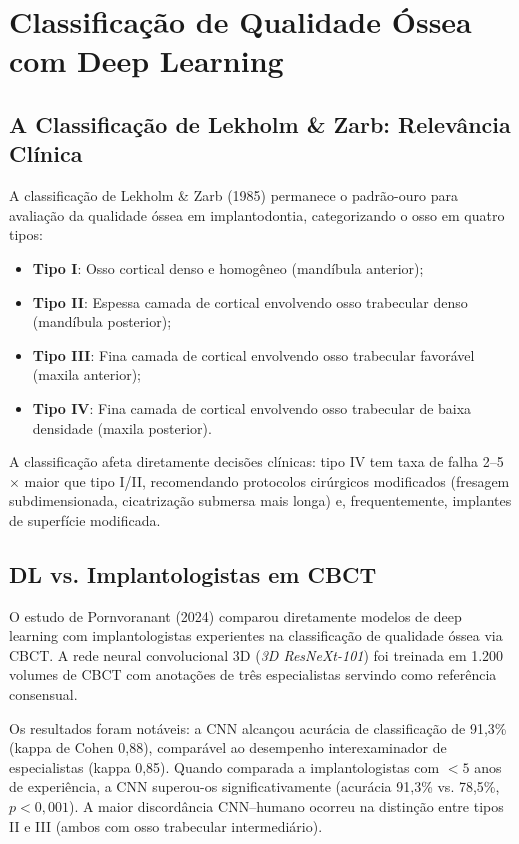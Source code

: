 \section{Classificação de Qualidade Óssea com Deep Learning}

\subsection{A Classificação de Lekholm \& Zarb: Relevância Clínica}

A classificação de Lekholm \& Zarb (1985) permanece o padrão-ouro para avaliação da qualidade óssea em implantodontia, categorizando o osso em quatro tipos:
\begin{itemize}
    \item \textbf{Tipo I}: Osso cortical denso e homogêneo (mandíbula anterior);
    \item \textbf{Tipo II}: Espessa camada de cortical envolvendo osso trabecular denso (mandíbula posterior);
    \item \textbf{Tipo III}: Fina camada de cortical envolvendo osso trabecular favorável (maxila anterior);
    \item \textbf{Tipo IV}: Fina camada de cortical envolvendo osso trabecular de baixa densidade (maxila posterior).
\end{itemize}

A classificação afeta diretamente decisões clínicas: tipo IV tem taxa de falha 2--5$\times$ maior que tipo I/II, recomendando protocolos cirúrgicos modificados (fresagem subdimensionada, cicatrização submersa mais longa) e, frequentemente, implantes de superfície modificada.

\subsection{DL vs. Implantologistas em CBCT}

O estudo de Pornvoranant (2024) comparou diretamente modelos de deep learning com implantologistas experientes na classificação de qualidade óssea via CBCT. A rede neural convolucional 3D (\textit{3D ResNeXt-101}) foi treinada em 1.200 volumes de CBCT com anotações de três especialistas servindo como referência consensual.

Os resultados foram notáveis: a CNN alcançou acurácia de classificação de 91,3\% (kappa de Cohen 0,88), comparável ao desempenho interexaminador de especialistas (kappa 0,85). Quando comparada a implantologistas com $< 5$ anos de experiência, a CNN superou-os significativamente (acurácia 91,3\% vs. 78,5\%, $p < 0,001$). A maior discordância CNN--humano ocorreu na distinção entre tipos II e III (ambos com osso trabecular intermediário).

